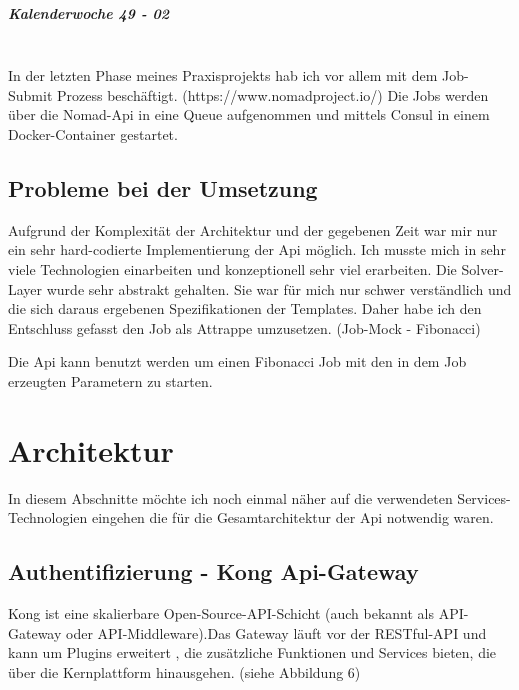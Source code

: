 \documentclass[12pt]{article}
\begin{document}
\subparagraph{Kalenderwoche 49 - 02}\mbox{}\\

In der letzten Phase meines Praxisprojekts hab ich vor allem mit dem Job-Submit Prozess beschäftigt. (https://www.nomadproject.io/) Die Jobs werden über die Nomad-Api in eine Queue aufgenommen und mittels Consul in einem Docker-Container gestartet.




\subsection{Probleme bei der Umsetzung}

Aufgrund der Komplexität der Architektur und der gegebenen Zeit war mir nur ein sehr hard-codierte Implementierung der Api möglich. Ich musste mich in sehr viele Technologien einarbeiten und konzeptionell sehr viel erarbeiten. Die Solver-Layer wurde sehr abstrakt gehalten. Sie war für mich nur schwer verständlich und die sich daraus ergebenen Spezifikationen der Templates. Daher habe ich den Entschluss gefasst den Job als Attrappe umzusetzen. (Job-Mock - Fibonacci)

Die Api kann benutzt werden um einen Fibonacci Job mit den in dem Job erzeugten Parametern zu starten.


\newpage

\section{Architektur}

In diesem Abschnitte möchte ich noch einmal näher auf die verwendeten Services-Technologien eingehen die für die Gesamtarchitektur der Api notwendig waren.

\subsection{Authentifizierung - Kong Api-Gateway}

Kong ist eine skalierbare Open-Source-API-Schicht (auch bekannt als API-Gateway oder API-Middleware).Das Gateway läuft vor der RESTful-API und kann um Plugins erweitert , die zusätzliche Funktionen und Services bieten, die über die Kernplattform hinausgehen. (siehe Abbildung 6)
\end{document}

